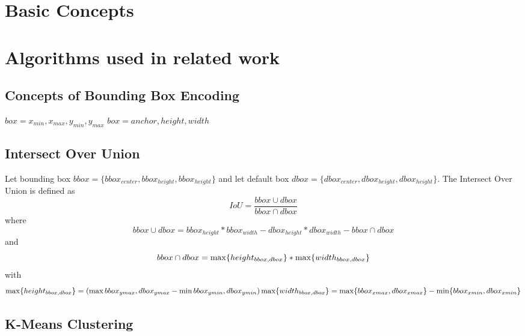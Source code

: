 \chapter{Basic Concepts}
\blindtext[1]

\chapter{Algorithms used in related work}
\blindtext[2]

\section{Concepts of Bounding Box Encoding}\label{append:Concepts of Bounding Box Encoding}
\(box = {x_{min}, x_{max}, y_{min}, y_{max}}\)
\(box = {anchor, height, width}\)
\blindtext[1]

\section{Intersect Over Union}\label{sect:Intersect Over Union}
Let bounding box \(bbox=\{bbox_{center}, bbox_{height}, bbox_{height}\}\) and let default box \(dbox=\{dbox_{center}, dbox_{height}, dbox_{height}\}\).
The Intersect Over Union is defined as
\begin{equation}
    IoU=\frac{bbox\cup dbox}{bbox\cap dbox}
\end{equation}
where
\begin{equation}
    bbox\cup dbox=bbox_{height}*bbox_{width} - dbox_{height}*dbox_{width} - bbox\cap dbox
\end{equation}
and
\begin{equation}
   bbox\cap dbox = \max\{height_{bbox, dbox}\}*\max\{width_{bbox, dbox}\}\\
\end{equation}
with
\begin{equation}
    \max\{height_{bbox, dbox}\} = (\max{bbox_{ymax}, dbox_{ymax}}-\min{bbox_{ymin}, dbox_{ymin}})\\
    \max\{width_{bbox, dbox}\}= \max\{bbox_{xmax}, dbox_{xmax}\}-\min\{bbox_{xmin}, dbox_{xmin}\}
\end{equation}

\section{K-Means Clustering}\label{append:K-Means Clustering}
~\cite[386-390]{James.2017}

